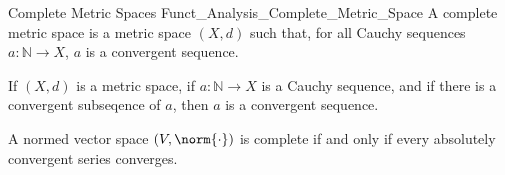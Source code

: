 \documentclass[crop=false,class=book,oneside]{standalone}                      %
\begin{document}
            \begin{ldefinition}{Complete Metric Spaces}
                  {Funct_Analysis_Complete_Metric_Space}
                A complete metric space is a metric space
                $(X,d)$ such that, for all Cauchy sequences
                $a:\mathbb{N}\rightarrow{X}$, $a$ is a convergent
                sequence.
            \end{ldefinition}
            \begin{theorem}
                If $(X,d)$ is a metric space, if
                $a:\mathbb{N}\rightarrow{X}$ is a Cauchy
                sequence, and if there is a convergent subseqence
                of $a$, then $a$ is a convergent sequence.
            \end{theorem}
            \begin{theorem}
                A normed vector space $(V,\norm{\cdot})$ is
                complete if and only if every absolutely
                convergent series converges.
            \end{theorem}
\end{document}
